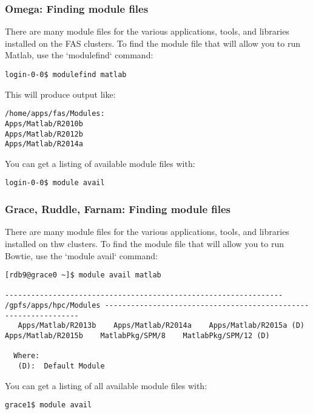 \documentclass[10pt]{beamer}
\begin{document}
\begin{frame}[fragile]
\frametitle{Omega: Finding module files}
There are many module files for the various applications, tools, and
libraries installed on the FAS clusters.  To find the module file that
will allow you to run Matlab, use the `modulefind` command:

\begin{verbatim}
login-0-0$ modulefind matlab
\end{verbatim}

This will produce output like:

\begin{verbatim}
/home/apps/fas/Modules:
Apps/Matlab/R2010b
Apps/Matlab/R2012b
Apps/Matlab/R2014a
\end{verbatim}

You can get a listing of available module files with:
\begin{verbatim}
login-0-0$ module avail
\end{verbatim}
\end{frame}

\begin{frame}[fragile]
\frametitle{Grace, Ruddle, Farnam: Finding module files}
There are many module files for the various applications, tools, and
libraries installed on thw clusters.  To find the module file that
will allow you to run Bowtie, use the `module avail` command:

\begin{verbatim}
[rdb9@grace0 ~]$ module avail matlab

---------------------------------------------------------------- /gpfs/apps/hpc/Modules ----------------------------------------------------------------
   Apps/Matlab/R2013b    Apps/Matlab/R2014a    Apps/Matlab/R2015a (D)    Apps/Matlab/R2015b    MatlabPkg/SPM/8    MatlabPkg/SPM/12 (D)

  Where:
   (D):  Default Module

\end{verbatim}

You can get a listing of all available module files with:
\begin{verbatim}
grace1$ module avail
\end{verbatim}
\end{frame}
\end{document}
